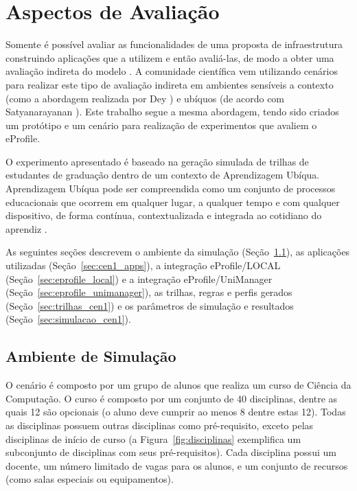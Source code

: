 \section{Aspectos de Avaliação}
\label{ch:avaliacao}

Somente é possível avaliar as funcionalidades de uma proposta de infraestrutura construindo aplicações que a utilizem e então avaliá-las, de modo a obter uma avaliação indireta do modelo \cite{edwards03}. A comunidade científica vem utilizando cenários para realizar este tipo de avaliação indireta em ambientes sensíveis a contexto (como a abordagem realizada por Dey \cite{dey2001b}) e ubíquos (de acordo com Satyanarayanan \cite{satyanarayanan01}). Este trabalho segue a mesma abordagem, tendo sido criados um protótipo e um cenário para realização de experimentos que avaliem o eProfile.

O experimento apresentado é baseado na geração simulada de trilhas de estudantes de graduação dentro de um contexto de Aprendizagem Ubíqua. Aprendizagem Ubíqua pode ser compreendida como um conjunto de processos educacionais que ocorrem em qualquer lugar, a qualquer tempo e com qualquer dispositivo, de forma contínua, contextualizada e integrada ao cotidiano do aprendiz \cite{barbosa11}.

As seguintes seções descrevem o ambiente da simulação (Seção~\ref{sec:desc_cen1}), as aplicações utilizadas (Seção~\ref{sec:cen1_apps}), a integração eProfile/LOCAL (Seção~\ref{sec:eprofile_local}) e a integração eProfile/UniManager (Seção~\ref{sec:eprofile_unimanager}), as trilhas, regras e perfis gerados (Seção~\ref{sec:trilhas_cen1}) e os parâmetros de simulação e resultados (Seção~\ref{sec:simulacao_cen1}).


\subsection{Ambiente de Simulação}
\label{sec:desc_cen1}

O cenário é composto por um grupo de alunos que realiza um curso de Ciência da Computação. O curso é composto por um conjunto de 40 disciplinas, dentre as quais 12 são opcionais (o aluno deve cumprir ao menos 8 dentre estas 12). Todas as disciplinas possuem outras disciplinas como pré-requisito, exceto pelas disciplinas de início de curso (a Figura~\ref{fig:disciplinas} exemplifica um subconjunto de disciplinas com seus pré-requisitos). Cada disciplina possui um docente, um número limitado de vagas para os alunos, e um conjunto de recursos (como salas especiais ou equipamentos).

